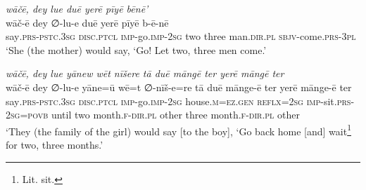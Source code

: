 \ea \label{ŽE.78}
\textit{wāčē, dey lue duē yerē pīyē bēnē’} \\ 
\gll wāč-ē dey ∅-lu-e duē yerē pīyē b-ē-nē \\ 
 say\textsc{.prs-pstc}\textsc{.3sg} \textsc{disc.}\textsc{ptcl} \textsc{imp-}go.\textsc{imp-}\textsc{2sg} two three man\textsc{.dir}\textsc{.pl} \textsc{sbjv-}come\textsc{.prs}\textsc{-3pl} \\ 
\glt `She (the mother) would say, ‘Go! Let two, three men come.'
\z 
 
\ea \label{ŽE.82}
\textit{wāčē, dey lue yānew wēt nīšere tā duē māngē ter yerē māngē ter} \\ 
\gll wāč-ē dey ∅-lu-e yāne=ū wē=t ∅-nīš-e=re tā duē mānge-ē ter yerē mānge-ē ter \\ 
 say\textsc{.prs-pstc}\textsc{.3sg} \textsc{disc}.\textsc{ptcl} \textsc{imp-}go.\textsc{imp-}\textsc{2sg} house\textsc{.m}\textsc{\textsc{=ez.gen}} \textsc{reflx}\textsc{=\textsc{2sg}} \textsc{imp-}sit\textsc{.prs}-\textsc{2sg}\textsc{=\textsc{povb}} until two month\textsc{.f}\textsc{-dir}\textsc{.pl} other three month\textsc{.f}\textsc{-dir}\textsc{.pl} other \\ 
\glt `They (the family of the girl) would say [to the boy], ‘Go back home [and] wait\footnote{Lit. sit.} for two, three months.'
\z 
 
